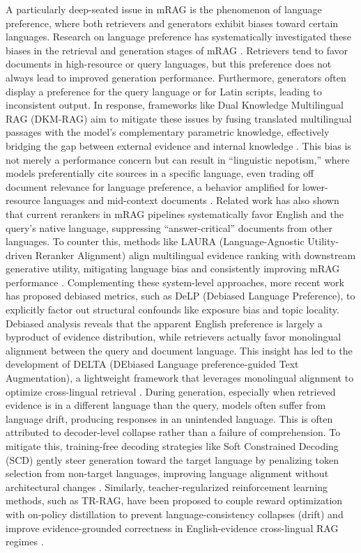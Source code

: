 \documentclass[11pt]{article}
\begin{document}
A particularly deep-seated issue in mRAG is the phenomenon of language preference, where both retrievers and generators exhibit biases toward certain languages. Research on language preference has systematically investigated these biases in the retrieval and generation stages of mRAG \cite{ref371}. Retrievers tend to favor documents in high-resource or query languages, but this preference does not always lead to improved generation performance. Furthermore, generators often display a preference for the query language or for Latin scripts, leading to inconsistent output. In response, frameworks like Dual Knowledge Multilingual RAG (DKM-RAG) aim to mitigate these issues by fusing translated multilingual passages with the model's complementary parametric knowledge, effectively bridging the gap between external evidence and internal knowledge \cite{ref371}. This bias is not merely a performance concern but can result in ``linguistic nepotism,'' where models preferentially cite sources in a specific language, even trading off document relevance for language preference, a behavior amplified for lower-resource languages and mid-context documents \cite{ref372}. Related work has also shown that current rerankers in mRAG pipelines systematically favor English and the query's native language, suppressing ``answer-critical'' documents from other languages. To counter this, methods like LAURA (Language-Agnostic Utility-driven Reranker Alignment) align multilingual evidence ranking with downstream generative utility, mitigating language bias and consistently improving mRAG performance \cite{ref373}. Complementing these system-level approaches, more recent work has proposed debiased metrics, such as DeLP (Debiased Language Preference), to explicitly factor out structural confounds like exposure bias and topic locality. Debiased analysis reveals that the apparent English preference is largely a byproduct of evidence distribution, while retrievers actually favor monolingual alignment between the query and document language. This insight has led to the development of DELTA (DEbiased Language preference-guided Text Augmentation), a lightweight framework that leverages monolingual alignment to optimize cross-lingual retrieval \cite{ref374}. During generation, especially when retrieved evidence is in a different language than the query, models often suffer from language drift, producing responses in an unintended language. This is often attributed to decoder-level collapse rather than a failure of comprehension. To mitigate this, training-free decoding strategies like Soft Constrained Decoding (SCD) gently steer generation toward the target language by penalizing token selection from non-target languages, improving language alignment without architectural changes \cite{ref375}. Similarly, teacher-regularized reinforcement learning methods, such as TR-RAG, have been proposed to couple reward optimization with on-policy distillation to prevent language-consistency collapses (drift) and improve evidence-grounded correctness in English-evidence cross-lingual RAG regimes \cite{ref376}.
\end{document}

